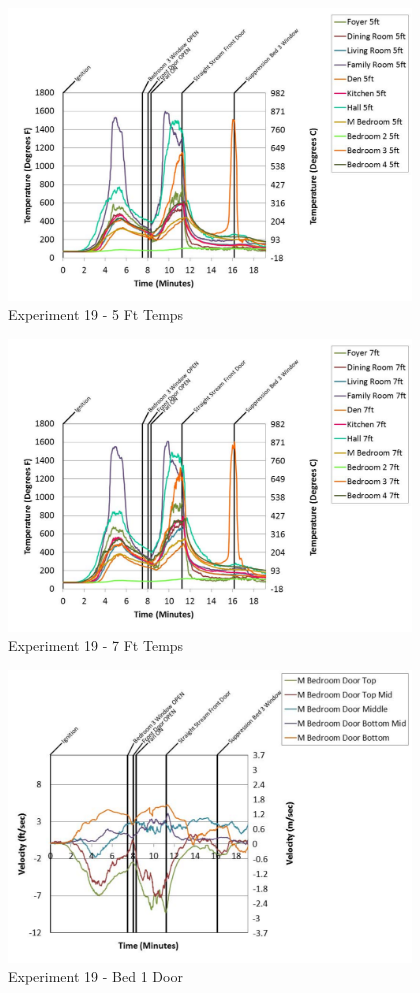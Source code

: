 \documentclass{article}
\begin{document}
\begin{appendices}
	\begin{figure}[h!]
		\centering
		\includegraphics[height=3.05in]{0_Images/Results_Charts/Exp_19_Charts/5FtTemps.pdf}
		\caption{Experiment 19 - 5 Ft Temps}
	\end{figure}
 

	\begin{figure}[h!]
		\centering
		\includegraphics[height=3.05in]{0_Images/Results_Charts/Exp_19_Charts/7FtTemps.pdf}
		\caption{Experiment 19 - 7 Ft Temps}
	\end{figure}
 
	\clearpage

	\begin{figure}[h!]
		\centering
		\includegraphics[height=3.05in]{0_Images/Results_Charts/Exp_19_Charts/Bed1Door.pdf}
		\caption{Experiment 19 - Bed 1 Door}
	\end{figure}
 


\end{appendices}
\end{document}
